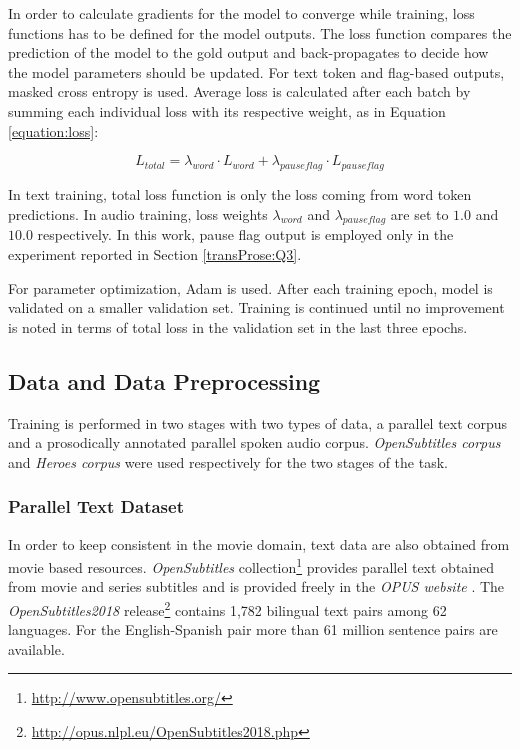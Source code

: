 In order to calculate gradients for the model to converge while training, loss functions has to be defined for the model outputs. The loss function compares the prediction of the model to the gold output and back-propagates to decide how the model parameters should be updated. For text token and flag-based outputs, masked cross entropy is used. Average loss is calculated after each batch by summing each individual loss with its respective weight, as in Equation \ref{equation:loss}:

\begin{equation}
    \label{equation:loss}
    { L }_{ total }= { \lambda }_{ word }\cdot { L }_{ word }+ { \lambda }_{ pauseflag }\cdot { L }_{ pauseflag }
\end{equation}

In text training, total loss function is only the loss coming from word token predictions. In audio training, loss weights ${ \lambda }_{ word }$ and ${ \lambda }_{ pauseflag }$ are set to $1.0$ and $10.0$ respectively. In this work, pause flag output is employed only in the experiment reported in Section \ref{transProse:Q3}. 

For parameter optimization, Adam \citep{DBLP:journals/corr/KingmaB14} is used. After each training epoch, model is validated on a smaller validation set. Training is continued until no improvement is noted in terms of total loss in the validation set in the last three epochs. 

\subsection{Data and Data Preprocessing}
\label{transProse:methodology:data}

Training is performed in two stages with two types of data, a parallel text corpus and a prosodically annotated parallel spoken audio corpus. \textit{OpenSubtitles corpus} and \textit{Heroes corpus} were used respectively for the two stages of the task. 

\subsubsection{Parallel Text Dataset}
In order to keep consistent in the movie domain, text data are also obtained from movie based resources. \textit{OpenSubtitles} collection\footnote{\url{http://www.opensubtitles.org/}} provides parallel text obtained from movie and series subtitles and is provided freely in the \textit{OPUS website} \citep{Lison2016OpenSubtitles2016EL}. The \textit{OpenSubtitles2018} release\footnote{\url{http://opus.nlpl.eu/OpenSubtitles2018.php}} contains 1,782 bilingual text pairs among 62 languages. For the English-Spanish pair more than 61 million sentence pairs are available. 

